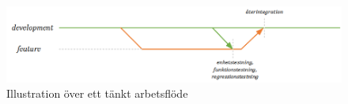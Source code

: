\begin{figure}[h]
  \centering
  \includegraphics[scale=1]{git_workflow}
  \caption{Illustration över ett tänkt arbetsflöde}
  \label{fig:git_workflow}
\end{figure}






